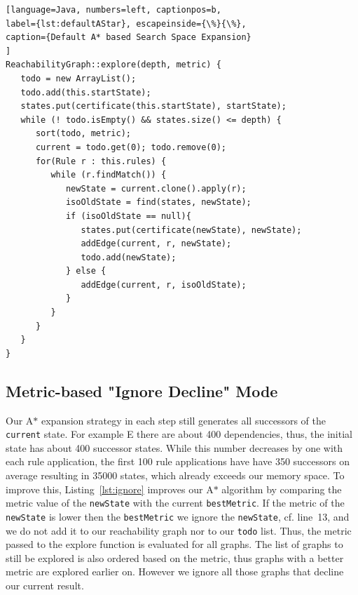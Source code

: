 \documentclass[submission,copyright,creativecommons]{eptcs}
\begin{document}
\begin{lstlisting}[language=Java, numbers=left, captionpos=b, 
label={lst:defaultAStar}, escapeinside={\%}{\%},
caption={Default A* based Search Space Expansion}
]
ReachabilityGraph::explore(depth, metric) {
   todo = new ArrayList();
   todo.add(this.startState);
   states.put(certificate(this.startState), startState);
   while (! todo.isEmpty() && states.size() <= depth) {
      sort(todo, metric);
      current = todo.get(0); todo.remove(0);
      for(Rule r : this.rules) {
         while (r.findMatch()) {
            newState = current.clone().apply(r);
            isoOldState = find(states, newState);
            if (isoOldState == null){
               states.put(certificate(newState), newState);
               addEdge(current, r, newState);
               todo.add(newState);
            } else {
               addEdge(current, r, isoOldState);
            }
         }
      }
   }
}
\end{lstlisting}


\subsection{Metric-based "Ignore Decline" Mode}

Our A$*$ expansion strategy in each step still generates all successors of the 
\texttt{current} state. For example E there are about 400 dependencies, thus, 
the initial state has about 400 successor states. While this number decreases 
by one with each rule application, the first 100 rule applications have 
have 350 successors on average resulting in 35000 states, which already exceeds our 
memory space. To improve this, Listing~\ref{lst:ignore} improves our 
A$*$ algorithm by comparing the metric value of the \texttt{newState} with 
the current \texttt{bestMetric}. If the metric of the \texttt{newState} is lower 
then the \texttt{bestMetric} we ignore the \texttt{newState}, cf. line~13, and 
we do not add it to our reachability graph nor to our \texttt{todo} list.  
Thus, the metric passed to the explore function is 
evaluated for all graphs. The list of graphs to still be explored is also 
ordered based on the metric, thus graphs with a better metric are explored 
earlier on. However we ignore all those graphs that decline our current result.
\end{document}
